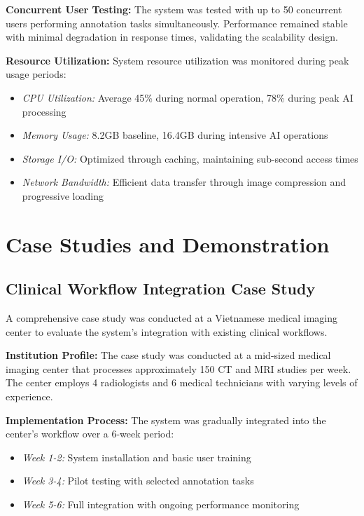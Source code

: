 \textbf{Concurrent User Testing:} The system was tested with up to 50 concurrent users performing annotation tasks simultaneously. Performance remained stable with minimal degradation in response times, validating the scalability design.

\textbf{Resource Utilization:} System resource utilization was monitored during peak usage periods:

\begin{itemize}
    \item \textit{CPU Utilization:} Average 45\% during normal operation, 78\% during peak AI processing
    \item \textit{Memory Usage:} 8.2GB baseline, 16.4GB during intensive AI operations
    \item \textit{Storage I/O:} Optimized through caching, maintaining sub-second access times
    \item \textit{Network Bandwidth:} Efficient data transfer through image compression and progressive loading
\end{itemize}

\section{Case Studies and Demonstration}

\subsection{Clinical Workflow Integration Case Study}

A comprehensive case study was conducted at a Vietnamese medical imaging center to evaluate the system's integration with existing clinical workflows.

\textbf{Institution Profile:} The case study was conducted at a mid-sized medical imaging center that processes approximately 150 CT and MRI studies per week. The center employs 4 radiologists and 6 medical technicians with varying levels of experience.

\textbf{Implementation Process:} The system was gradually integrated into the center's workflow over a 6-week period:

\begin{itemize}
    \item \textit{Week 1-2:} System installation and basic user training
    \item \textit{Week 3-4:} Pilot testing with selected annotation tasks
    \item \textit{Week 5-6:} Full integration with ongoing performance monitoring
\end{itemize}

